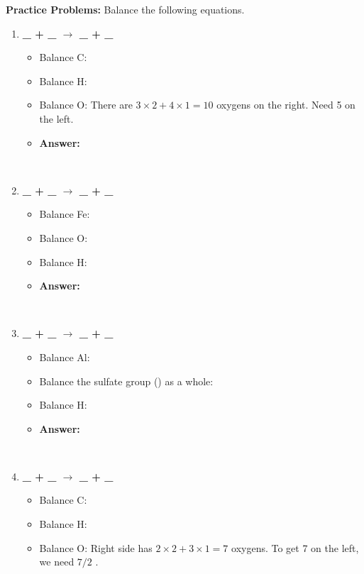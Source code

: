 \documentclass{article}
\begin{document}
\textbf{Practice Problems:} Balance the following equations.
\begin{enumerate}[itemsep=5pt]
    \item \textbf{\_  + \_  $\rightarrow$ \_  + \_ }
    \begin{itemize}
        \item Balance C: 
        \item Balance H: 
        \item Balance O: There are $3 \times 2 + 4 \times 1 = 10$ oxygens on the right. Need 5  on the left.
        \item \textbf{Answer:} 
    \end{itemize}
    \item \textbf{\_  + \_  $\rightarrow$ \_  + \_ }
    \begin{itemize}
        \item Balance Fe: 
        \item Balance O: 
        \item Balance H: 
        \item \textbf{Answer:} 
    \end{itemize}
    \item \textbf{\_  + \_  $\rightarrow$ \_  + \_ }
    \begin{itemize}
        \item Balance Al: 
        \item Balance the sulfate group () as a whole: 
        \item Balance H: 
        \item \textbf{Answer:} 
    \end{itemize}
    \item \textbf{\_  + \_  $\rightarrow$ \_  + \_ }
    \begin{itemize}
        \item Balance C: 
        \item Balance H: 
        \item Balance O: Right side has $2 \times 2 + 3 \times 1 = 7$ oxygens. To get 7 on the left, we need $7/2$ .

\end{itemize}
\end{enumerate}
\end{document}
